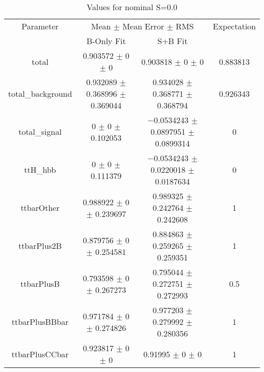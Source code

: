 \begin{table}
\centering
\caption{Values for nominal S=0.0}
\begin{tabular}{cccc}
\toprule
Parameter & \multicolumn{2}{c}{Mean $\pm$ Mean Error $\pm$ RMS} & Expectation\\
 & B-Only Fit & S+B Fit & \\
\midrule
total & \num{0.903572} $\pm$ \num{0} $\pm$ \num{0} & \num{0.903818} $\pm$ \num{0} $\pm$ \num{0} & \num{0.883813}\\
total\_background & \num{0.932089} $\pm$ \num{0.368996} $\pm$ \num{0.369044} & \num{0.934028} $\pm$ \num{0.368771} $\pm$ \num{0.368794} & \num{0.926343}\\
total\_signal & \num{0} $\pm$ \num{0} $\pm$ \num{0.102053} & \num{-0.0534243} $\pm$ \num{0.0897951} $\pm$ \num{0.0899314} & \num{0}\\
ttH\_hbb & \num{0} $\pm$ \num{0} $\pm$ \num{0.111379} & \num{-0.0534243} $\pm$ \num{0.0220018} $\pm$ \num{0.0187634} & \num{0}\\
ttbarOther & \num{0.988922} $\pm$ \num{0} $\pm$ \num{0.239697} & \num{0.989325} $\pm$ \num{0.242764} $\pm$ \num{0.242608} & \num{1}\\
ttbarPlus2B & \num{0.879756} $\pm$ \num{0} $\pm$ \num{0.254581} & \num{0.884863} $\pm$ \num{0.259265} $\pm$ \num{0.259351} & \num{1}\\
ttbarPlusB & \num{0.793598} $\pm$ \num{0} $\pm$ \num{0.267273} & \num{0.795044} $\pm$ \num{0.272751} $\pm$ \num{0.272993} & \num{0.5}\\
ttbarPlusBBbar & \num{0.971784} $\pm$ \num{0} $\pm$ \num{0.274826} & \num{0.977203} $\pm$ \num{0.279992} $\pm$ \num{0.280356} & \num{1}\\
ttbarPlusCCbar & \num{0.923817} $\pm$ \num{0} $\pm$ \num{0} & \num{0.91995} $\pm$ \num{0} $\pm$ \num{0} & \num{1}\\
\bottomrule
\end{tabular}
\end{table}